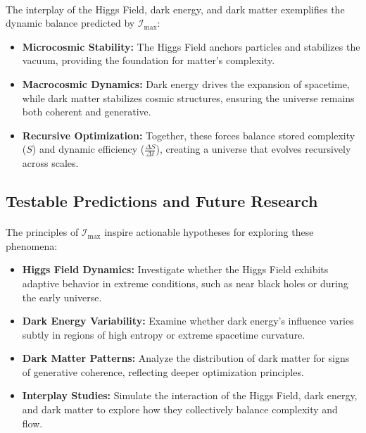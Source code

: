 \documentclass[12pt]{article}
\begin{document}
\paragraph{}
The interplay of the Higgs Field, dark energy, and dark matter exemplifies the dynamic balance predicted by \(\mathcal{I}_{\text{max}}\):
\begin{itemize}
    \item \textbf{Microcosmic Stability:} The Higgs Field anchors particles and stabilizes the vacuum, providing the foundation for matter’s complexity.
    \item \textbf{Macrocosmic Dynamics:} Dark energy drives the expansion of spacetime, while dark matter stabilizes cosmic structures, ensuring the universe remains both coherent and generative.
    \item \textbf{Recursive Optimization:} Together, these forces balance stored complexity (\(S\)) and dynamic efficiency (\(\frac{\Delta S}{\Delta t}\)), creating a universe that evolves recursively across scales.
\end{itemize}

\subsection{Testable Predictions and Future Research}
\paragraph{}
The principles of \(\mathcal{I}_{\text{max}}\) inspire actionable hypotheses for exploring these phenomena:
\begin{itemize}
    \item \textbf{Higgs Field Dynamics:} Investigate whether the Higgs Field exhibits adaptive behavior in extreme conditions, such as near black holes or during the early universe.
    \item \textbf{Dark Energy Variability:} Examine whether dark energy’s influence varies subtly in regions of high entropy or extreme spacetime curvature.
    \item \textbf{Dark Matter Patterns:} Analyze the distribution of dark matter for signs of generative coherence, reflecting deeper optimization principles.
    \item \textbf{Interplay Studies:} Simulate the interaction of the Higgs Field, dark energy, and dark matter to explore how they collectively balance complexity and flow.
\end{itemize}
\end{document}

